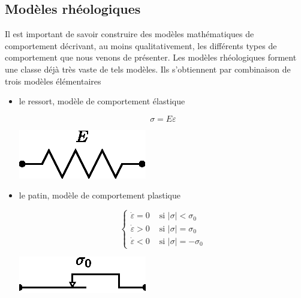 \subsection{Modèles rhéologiques} \label{ssec:Ch04-2.2}
Il est important de savoir construire des modèles mathématiques de comportement décrivant, au moins qualitativement, les différents types de comportement que nous venons de présenter.
Les modèles rhéologiques forment une classe déjà très vaste de tels modèles.
Ils s'obtiennent par combinaison de trois modèles élémentaires
\begin{itemize}
    \item le ressort, modèle de comportement élastique
        \begin{multicols}{2}
            \begin{equation}
                \sigma = E \varepsilon
                \label{eq:Ch04-039}
            \end{equation}
            \columnbreak
            \begin{center}
                \includegraphics{../images/T1_Ch04-0022}
            \end{center}
        \end{multicols}
    \item le patin, modèle de comportement plastique
        \begin{multicols}{2}
            \begin{equation}
                \begin{cases}
                    \dot\varepsilon = 0 & \text{ si } |\sigma|<\sigma_0 \\
                    \dot\varepsilon > 0 & \text{ si } |\sigma|=\sigma_0 \\
                    \dot\varepsilon < 0 & \text{ si } |\sigma|=-\sigma_0
                \end{cases}
                \label{eq:Ch04-040}
            \end{equation}
            \columnbreak
            \begin{center}
                \includegraphics{../images/T1_Ch04-0023}

\end{center}
\end{multicols}
\end{itemize}

